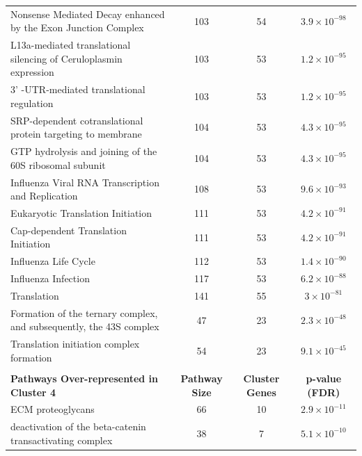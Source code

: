 \begin{table}[!Hp]
{\begin{tabular}{lccc}
  \rowcolor{Cluster_Orange!20} 
  Nonsense Mediated Decay enhanced by the Exon Junction Complex & 103 &  54 & $3.9 \times 10^{-98}$ \\ 
  \rowcolor{Cluster_Orange!30} 
  L13a-mediated translational silencing of Ceruloplasmin expression & 103 &  53 & $1.2 \times 10^{-95}$ \\ 
  \rowcolor{Cluster_Orange!20} 
  3' -UTR-mediated translational regulation & 103 &  53 & $1.2 \times 10^{-95}$ \\ 
  \rowcolor{Cluster_Orange!30} 
  SRP-dependent cotranslational protein targeting to membrane & 104 &  53 & $4.3 \times 10^{-95}$ \\ 
  \rowcolor{Cluster_Orange!20} 
  GTP hydrolysis and joining of the 60S ribosomal subunit & 104 &  53 & $4.3 \times 10^{-95}$ \\ 
  \rowcolor{Cluster_Orange!30} 
  Influenza Viral RNA Transcription and Replication & 108 &  53 & $9.6 \times 10^{-93}$ \\ 
  \rowcolor{Cluster_Orange!20} 
  Eukaryotic Translation Initiation & 111 &  53 & $4.2 \times 10^{-91}$ \\ 
  \rowcolor{Cluster_Orange!30} 
  Cap-dependent Translation Initiation & 111 &  53 & $4.2 \times 10^{-91}$ \\ 
  \rowcolor{Cluster_Orange!20} 
  Influenza Life Cycle & 112 &  53 & $1.4 \times 10^{-90}$ \\ 
  \rowcolor{Cluster_Orange!30} 
  Influenza Infection & 117 &  53 & $6.2 \times 10^{-88}$ \\ 
  \rowcolor{Cluster_Orange!20} 
  Translation & 141 &  55 & $3 \times 10^{-81}$ \\ 
  \rowcolor{Cluster_Orange!30} 
  Formation of the ternary complex, and subsequently, the 43S complex &  47 &  23 & $2.3 \times 10^{-48}$ \\ 
  \rowcolor{Cluster_Orange!20} 
  Translation initiation complex formation &  54 &  23 & $9.1 \times 10^{-45}$ \\ 
  \hline
  \\ 
  \cellcolor{white} \large{\textbf{Pathways Over-represented in Cluster 4}} & \large{\textbf{Pathway Size}} & \large{\textbf{Cluster Genes}} & \large{\textbf{p-value (FDR)}} \\ %
  \hline 
  \rowcolor{Cluster_Red!20}
  ECM proteoglycans &  66 &  10 & $2.9 \times 10^{-11}$ \\ 
  \rowcolor{Cluster_Red!15} 
  deactivation of the beta-catenin transactivating complex &  38 &   7 & $5.1 \times 10^{-10}$ \\ 

\end{tabular}}
\end{table}
